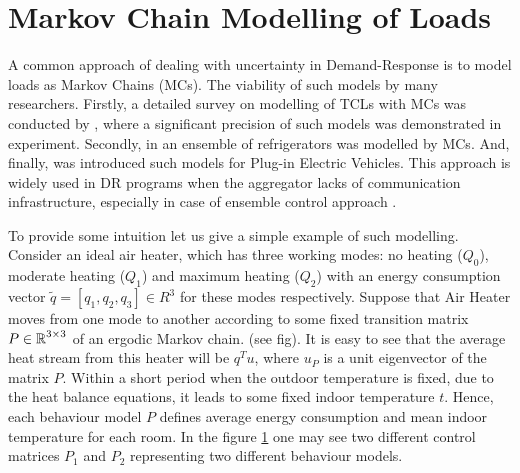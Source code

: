 \section{Markov Chain Modelling of Loads}

A common approach of dealing with uncertainty in Demand-Response is to model loads as Markov Chains (MCs). The viability of such models by many researchers. Firstly, a detailed survey on modelling of TCLs with MCs was conducted by \cite{Koch2011}, where a significant precision of such models was demonstrated in experiment. Secondly, in \cite{Trovato2015} an ensemble of refrigerators was modelled by MCs. And, finally, \cite{Wu2016} was introduced such models for Plug-in Electric Vehicles. This approach is widely used in DR programs when the aggregator lacks of communication infrastructure, especially in case of ensemble control approach \cite{Chertkov2017}. 

To provide some intuition let us give a simple example of such modelling. Consider an ideal air heater, which has three working modes: no heating ($Q_0$), moderate heating ($Q_1$) and maximum heating ($Q_2$) with an energy consumption vector $\widetilde{q} = [q_1, q_2, q_3] \in R^3$ for these modes respectively. Suppose that Air Heater moves from one mode to another according to some fixed transition matrix $P \in \operatorname{\mathbb{R}}^{3 \times 3}$ of an ergodic Markov chain. (see fig). It is easy to see that the average heat stream from this heater will be $q^Tu$, where $u_P$ is a unit eigenvector of the matrix $P$. Within a short period when the outdoor temperature is fixed, due to the heat balance equations, it leads to some fixed indoor temperature $t$. Hence, each behaviour model $P$ defines average energy consumption and mean indoor temperature for each room. In the figure \ref{fig:matrices_example} one may see two different control matrices $P_1$ and $P_2$ representing two different behaviour models. 

\begin{figure}
    \centering
    \label{fig:matrices_example}
\end{figure} 